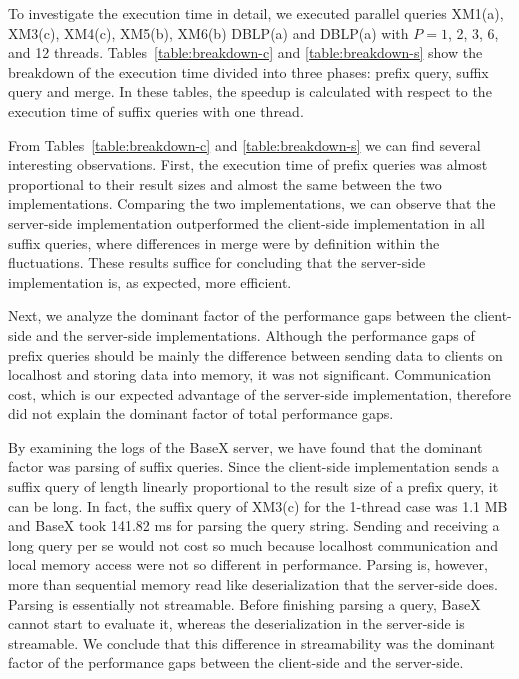 

To investigate the execution time in detail, we executed parallel queries
XM1(a), XM3(c), XM4(c), XM5(b), XM6(b) DBLP(a) and DBLP(a) with $P=1$, 2, 3, 6,
and 12 threads. Tables~\ref{table:breakdown-c} and \ref{table:breakdown-s} show
the breakdown of the execution time divided into three phases: prefix query,
suffix query and merge. In these tables, the speedup is calculated with respect
to the execution time of suffix queries with one thread.

From Tables~\ref{table:breakdown-c} and \ref{table:breakdown-s} we can find
several interesting observations. First, the execution time of prefix queries
was almost proportional to their result sizes and almost the same between the
two implementations. Comparing the two implementations, we can observe that the
server-side implementation outperformed the client-side implementation in all
suffix queries, where differences in merge were by definition within the
fluctuations.  These results suffice for concluding that the server-side
implementation is, as expected, more efficient.

Next, we analyze the dominant factor of the performance gaps between the
client-side and the server-side implementations. Although the performance gaps
of prefix queries should be mainly the difference between sending data to
clients on localhost and storing data into memory, it was not significant.
Communication cost, which is our expected advantage of the server-side
implementation, therefore did not explain the dominant factor of total
performance gaps.

By examining the logs of the BaseX server, we have found that the dominant
factor was parsing of suffix queries. Since the client-side implementation sends
a suffix query of length linearly proportional to the result size of a prefix
query, it can be long. In fact, the suffix query of XM3(c) for the 1-thread case
was 1.1 MB and BaseX took 141.82 ms for parsing the query string. Sending and
receiving a long query per se would not cost so much because localhost
communication and local memory access were not so different in performance.
Parsing is, however, more than sequential memory read like deserialization that
the server-side does. Parsing is essentially not streamable. Before finishing
parsing a query, BaseX cannot start to evaluate it, whereas the deserialization
in the server-side is streamable. We conclude that this difference in
streamability was the dominant factor of the performance gaps between the
client-side and the server-side.

